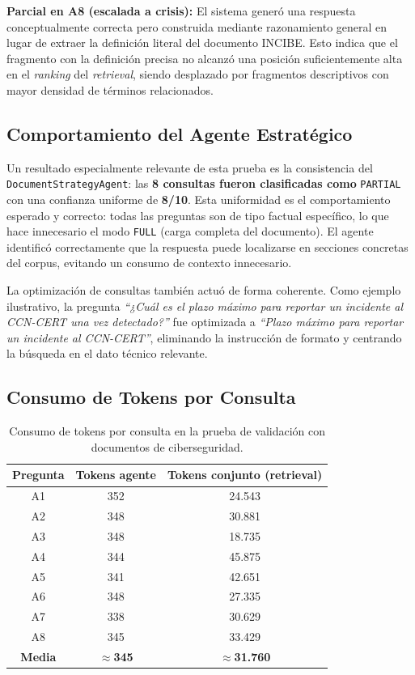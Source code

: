 \textbf{Parcial en A8 (escalada a crisis):} El sistema generó una respuesta conceptualmente correcta pero construida mediante razonamiento general en lugar de extraer la definición literal del documento INCIBE. Esto indica que el fragmento con la definición precisa no alcanzó una posición suficientemente alta en el \textit{ranking} del \textit{retrieval}, siendo desplazado por fragmentos descriptivos con mayor densidad de términos relacionados.

\subsection{Comportamiento del Agente Estratégico}

Un resultado especialmente relevante de esta prueba es la consistencia del \texttt{DocumentStrategy\-Agent}: las \textbf{8 consultas fueron clasificadas como} \texttt{PARTIAL} con una confianza uniforme de \textbf{8/10}. Esta uniformidad es el comportamiento esperado y correcto: todas las preguntas son de tipo factual específico, lo que hace innecesario el modo \texttt{FULL} (carga completa del documento). El agente identificó correctamente que la respuesta puede localizarse en secciones concretas del corpus, evitando un consumo de contexto innecesario.

La optimización de consultas también actuó de forma coherente. Como ejemplo ilustrativo, la pregunta \textit{``¿Cuál es el plazo máximo para reportar un incidente al CCN-CERT una vez detectado?''} fue optimizada a \textit{``Plazo máximo para reportar un incidente al CCN-CERT''}, eliminando la instrucción de formato y centrando la búsqueda en el dato técnico relevante.

\subsection{Consumo de Tokens por Consulta}

\begin{table}[ht]
\centering
\begin{tabular}{|c|c|c|}
\hline
\textbf{Pregunta} & \textbf{Tokens agente} & \textbf{Tokens conjunto (retrieval)} \\ \hline
A1 & 352 & 24.543 \\ \hline
A2 & 348 & 30.881 \\ \hline
A3 & 348 & 18.735 \\ \hline
A4 & 344 & 45.875 \\ \hline
A5 & 341 & 42.651 \\ \hline
A6 & 348 & 27.335 \\ \hline
A7 & 338 & 30.629 \\ \hline
A8 & 345 & 33.429 \\ \hline
\textbf{Media} & \textbf{$\approx$345} & \textbf{$\approx$31.760} \\ \hline
\end{tabular}
\caption{Consumo de tokens por consulta en la prueba de validación con documentos de ciberseguridad.}
\label{tab:tokens_cyber}
\end{table}

